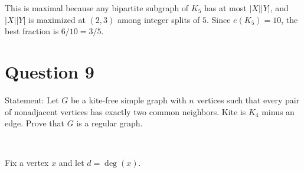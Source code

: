 \documentclass[11pt]{article}
\begin{document}
This is maximal because any bipartite subgraph of $K_5$ has at most $|X||Y|$, and $|X||Y|$
is maximized at $(2,3)$ among integer splits of $5$.
Since $e(K_5)=10$, the best fraction is $6/10=3/5$.

\newpage

\section*{Question 9}

Statement: Let $G$ be a kite-free simple graph with $n$ vertices such that every pair of nonadjacent vertices has exactly two common neighbors. Kite is $K_4$ minus an edge. Prove that $G$ is a regular graph.

~

Fix a vertex $x$ and let $d=\deg(x)$.
\end{document}
